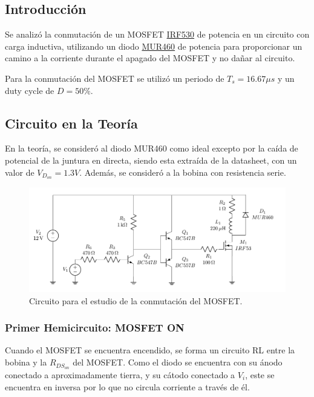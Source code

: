 %

%

\subsection{Introducción}

Se analizó la conmutación de un MOSFET \href{https://www.vishay.com/docs/91019/91019.pdf}{IRF530} de potencia en un circuito con carga inductiva, utilizando un diodo \href{https://www.onsemi.com/pdf/datasheet/mur420-d.pdf}{MUR460} de potencia para proporcionar un camino a la corriente durante el apagado del MOSFET y no dañar al circuito.


Para la conmutación del MOSFET se utilizó un periodo de $T_s = 16.67 \mu s$ y un duty cycle de $D = 50 \%$.

\subsection{Circuito en la Teoría}

En la teoría, se consideró al diodo MUR460 como ideal excepto por la caída de potencial de la juntura en directa, siendo esta extraída de la datasheet, con un valor de $V_{D_{on}} = 1.3V$. Además, se consideró a la bobina con resistencia serie.

\begin{figure}[H]
	\centering
	\includegraphics[width=0.7\linewidth, page=1]{ImagenesEjercicio-1/CircuitsEj1}
	\caption{Circuito para el estudio de la conmutación del MOSFET.}
	\label{ej1:fig:circuito}
\end{figure}

\subsubsection{Primer Hemicircuito: MOSFET ON}

Cuando el MOSFET se encuentra encendido, se forma un circuito RL entre la bobina y la $R_{DS_{on}}$ del MOSFET. Como el diodo se encuentra con su ánodo conectado a aproximadamente tierra, y su cátodo conectado a $V_i$, este se encuentra en inversa por lo que no circula corriente a través de él.

